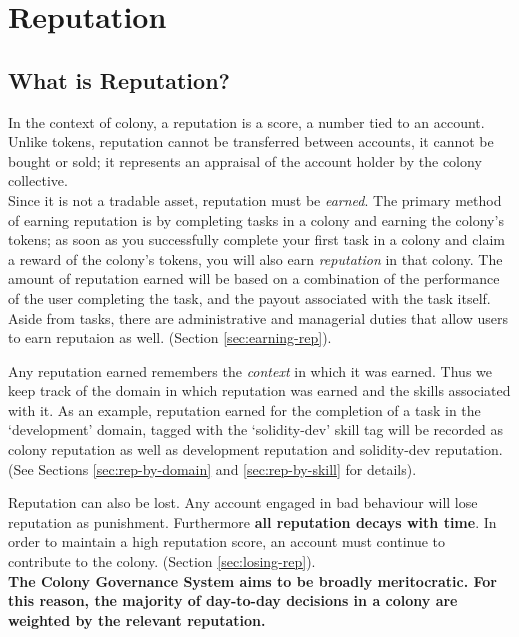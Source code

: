 \section{Reputation}
\subsection{What is Reputation?}
In the context of colony, a reputation is a score, a number tied to an account. Unlike tokens, reputation cannot be transferred between accounts, it cannot be bought or sold; it represents an appraisal of the account holder by the colony collective.\\
Since it is not a tradable asset, reputation must be \emph{earned}. The primary method of earning reputation is by completing tasks in a colony and earning the colony's tokens; as soon as you successfully complete your first task in a colony and claim a reward of the colony's tokens, you will also earn \emph{reputation} in that colony. The amount of reputation earned will be based on a combination of the performance of the user completing the task, and the payout associated with the task itself. Aside from tasks, there are administrative and managerial duties that allow users to earn reputaion as well. (Section \ref{sec:earning-rep}).

Any reputation earned remembers the \emph{context} in which it was earned. Thus we keep track of the domain in which reputation was earned and the skills associated with it. As an example, reputation earned for the completion of a task in the `development' domain, tagged with the `solidity-dev' skill tag will be recorded as colony reputation as well as development reputation and solidity-dev reputation. (See Sections \ref{sec:rep-by-domain} and \ref{sec:rep-by-skill} for details).

Reputation can also be lost. Any account engaged in bad behaviour will lose reputation as punishment. Furthermore \textbf{all reputation decays with time}. %
In order to maintain a high reputation score, an account must continue to contribute to the colony. (Section \ref{sec:losing-rep}).\\

\textbf{The Colony Governance System aims to be broadly meritocratic. For this reason, the majority of day-to-day decisions in a colony are weighted by the relevant reputation.}\\ %

